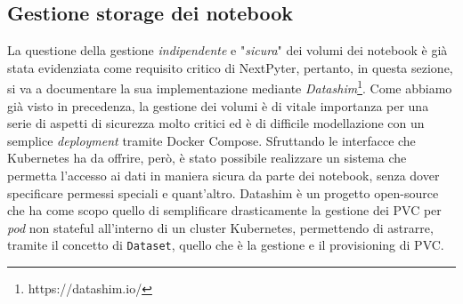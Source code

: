\subsection{Gestione storage dei notebook}
La questione della gestione \textit{indipendente} e "\textit{sicura}" dei volumi dei notebook è già stata evidenziata come requisito critico di NextPyter, pertanto, in questa sezione, si va a documentare la sua implementazione mediante \textit{Datashim}\footnote{https://datashim.io/}.
\newline
Come abbiamo già visto in precedenza, la gestione dei volumi è di vitale importanza per una serie di aspetti di sicurezza molto critici ed è di difficile modellazione con un semplice \textit{deployment} tramite Docker Compose. Sfruttando le interfacce che Kubernetes ha da offrire, però, è stato possibile realizzare un sistema che permetta l'accesso ai dati in maniera sicura da parte dei notebook, senza dover specificare permessi speciali e quant'altro.
\newline
Datashim è un progetto open-source che ha come scopo quello di semplificare drasticamente la gestione dei PVC per \textit{pod} non stateful all'interno di un cluster Kubernetes, permettendo di astrarre, tramite il concetto di \verb|Dataset|, quello che è la gestione e il provisioning di PVC.
